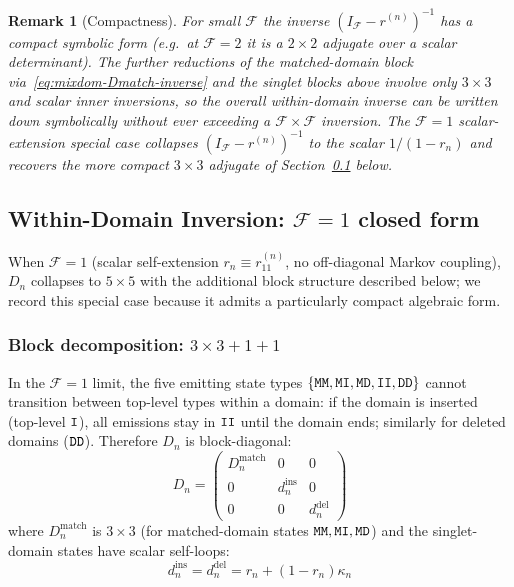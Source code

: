 \documentclass{article}
\newtheorem{remark}{Remark}
\newcommand\ext{r}
\newcommand\dom{n}
\newcommand\nfrag{\mathcal{F}}
\newcommand\mat{{\tt M}}
\newcommand\ins{{\tt I}}
\newcommand\del{{\tt D}}
\begin{document}
\begin{remark}[Compactness]
For small $\nfrag$ the inverse $(I_\nfrag - \ext^{(\dom)})^{-1}$ has a
compact symbolic form (e.g.\ at $\nfrag = 2$ it is a $2 \times 2$
adjugate over a scalar determinant). The further reductions of the
matched-domain block via~\eqref{eq:mixdom-Dmatch-inverse} and the
singlet blocks above involve only $3 \times 3$ and scalar inner
inversions, so the overall within-domain inverse can be
written down symbolically without ever exceeding a $\nfrag \times
\nfrag$ inversion. The $\nfrag = 1$ scalar-extension special case
collapses $(I_\nfrag - \ext^{(\dom)})^{-1}$ to the scalar
$1/(1 - \ext_\dom)$ and recovers the more compact
$3 \times 3$ adjugate of Section~\ref{sec:within-domain-inversion}
below.
\end{remark}

\subsection{\texorpdfstring{Within-Domain Inversion: $\nfrag = 1$ closed form}{Within-Domain Inversion: F = 1 closed form}}
\label{sec:within-domain-inversion}

When $\nfrag = 1$ (scalar self-extension
$\ext_\dom \equiv \ext^{(\dom)}_{11}$, no off-diagonal Markov coupling),
$D_\dom$ collapses to $5 \times 5$ with the additional block structure
described below; we record this special case because it admits a
particularly compact algebraic form.

\subsubsection{\texorpdfstring{Block decomposition: $3 \times 3 + 1 + 1$}{Block decomposition: 3 x 3 + 1 + 1}}

In the $\nfrag = 1$ limit, the five emitting state types
$\{\mat\mat, \mat\ins, \mat\del, \ins\ins, \del\del\}$
cannot transition between top-level types within a domain:
if the domain is inserted (top-level $\ins$), all emissions stay in
$\ins\ins$ until the domain ends; similarly for deleted domains
($\del\del$). Therefore $D_\dom$ is block-diagonal:
\[
D_\dom = \begin{pmatrix} D_\dom^{\text{match}} & 0 & 0 \\ 0 & d_\dom^{\text{ins}} & 0 \\ 0 & 0 & d_\dom^{\text{del}} \end{pmatrix}
\]
where $D_\dom^{\text{match}}$ is $3 \times 3$ (for matched-domain states
$\mat\mat, \mat\ins, \mat\del$) and the singlet-domain states have
scalar self-loops:
\[
d_\dom^{\text{ins}} = d_\dom^{\text{del}} = \ext_\dom + (1 - \ext_\dom)\kappa_\dom
\]
\end{document}
